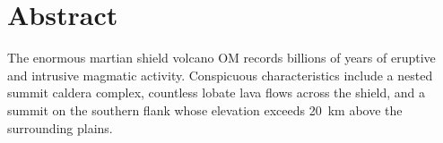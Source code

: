 \chapter{Abstract}
The enormous martian shield volcano \acl{OM} records billions of years of eruptive and intrusive magmatic activity. Conspicuous characteristics include a nested summit caldera complex, countless lobate lava flows across the shield, and a summit on the southern flank whose elevation exceeds \qty{20}{\km} above the surrounding plains.